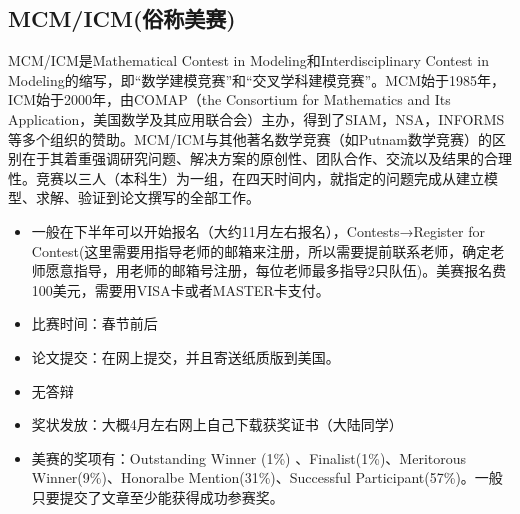 \documentclass[11pt, a4paper, UTF8]{ctexart}
\begin{document}
\subsection{MCM/ICM(俗称美赛)}
MCM/ICM是Mathematical Contest in Modeling和Interdisciplinary Contest in Modeling的缩写，即“数学建模竞赛”和“交叉学科建模竞赛”。MCM始于1985年，ICM始于2000年，由COMAP（the Consortium for Mathematics and Its Application，美国数学及其应用联合会）主办，得到了SIAM，NSA，INFORMS等多个组织的赞助。MCM/ICM与其他著名数学竞赛（如Putnam数学竞赛）的区别在于其着重强调研究问题、解决方案的原创性、团队合作、交流以及结果的合理性。竞赛以三人（本科生）为一组，在四天时间内，就指定的问题完成从建立模型、求解、验证到论文撰写的全部工作。\\
\begin{itemize}
\item 一般在下半年可以开始报名（大约11月左右报名），Contests→Register for Contest(这里需要用指导老师的邮箱来注册，所以需要提前联系老师，确定老师愿意指导，用老师的邮箱号注册，每位老师最多指导2只队伍)。美赛报名费100美元，需要用VISA卡或者MASTER卡支付。
\item 比赛时间：春节前后
\item 论文提交：在网上提交，并且寄送纸质版到美国。
\item 无答辩
\item 奖状发放：大概4月左右网上自己下载获奖证书（大陆同学）
\item 美赛的奖项有：Outstanding Winner (1\%) 、Finalist(1\%)、Meritorous Winner(9\%)、Honoralbe Mention(31\%)、Successful Participant(57\%)。一般只要提交了文章至少能获得成功参赛奖。
\end{itemize}
\end{document}
